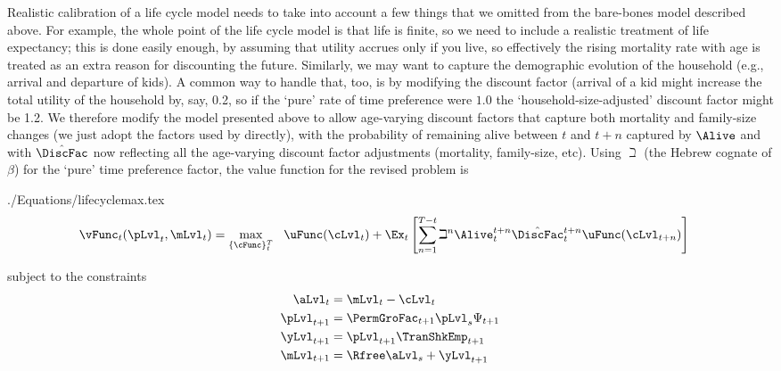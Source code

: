 \documentclass[titlepage, headings=optiontotocandhead]{\econtex}
\begin{document}
Realistic calibration of a life cycle model needs to take into account a few things that we omitted from the bare-bones model described above. For example, the whole point of the life cycle model is that life is finite, so we need to include a realistic treatment of life expectancy; this is done easily enough, by assuming that utility accrues only if you live, so effectively the rising mortality rate with age is treated as an extra reason for discounting the future.  Similarly, we may want to capture the demographic evolution of the household (e.g., arrival and departure of kids).  A common way to handle that, too, is by modifying the discount factor (arrival of a kid might increase the total utility of the household by, say, 0.2, so if the `pure' rate of time preference were $1.0$ the `household-size-adjusted' discount factor might be 1.2.  We therefore modify the model presented above to allow age-varying discount factors that capture both mortality and family-size changes (we just adopt the factors used by \cite{cagettiWprofiles} directly), with the probability of remaining alive between $t$ and $t+n$ captured by $\Alive$ and with $\hat{\DiscFac}$ now reflecting all the age-varying discount factor adjustments (mortality, family-size, etc).  Using $\beth$ (the Hebrew cognate of $\beta$) for the `pure' time preference factor, the value function for the revised problem is
\begin{verbatimwrite}{./Equations/lifecyclemax.tex}
  \begin{equation}\begin{gathered}\begin{aligned}
\vFunc_{t}(\pLvl_{t},\mLvl_{t}) & =    \max_{\{\cFunc\}_{t}^{T}}~~ \uFunc(\cLvl_{t})+\Ex_{t}\left[\sum_{n=1}^{T-t} {\beth}^{n} \Alive_{t}^{t+n}\hat{\DiscFac}_{t}^{t+n} \uFunc(\cLvl_{t+n}) \right]   \label{eq:lifecyclemax}
\end{aligned}\end{gathered}  \end{equation}
\end{verbatimwrite}
\unskip
subject to the constraints
\begin{equation*}\begin{gathered}\begin{aligned}
      \aLvl_{t}  & = \mLvl_{t}-\cLvl_{t}
      \\      \pLvl_{t+1}  & = \PermGroFac_{t+1}\pLvl_{s}\Psi_{t+1}
      \\      \yLvl_{t+1}  & = \pLvl_{t+1}\TranShkEmp _{t+1}
      \\      \mLvl_{t+1}  & = \Rfree \aLvl_{s}+\yLvl_{t+1}
    \end{aligned}\end{gathered}\end{equation*}
\end{document}
